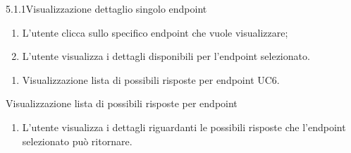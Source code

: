 \begin{usecase}{5.1.1}{Visualizzazione dettaglio singolo endpoint}\label{uc:visualizzazione-dettaglio-singolo-endpoint}

    \usecasemain{}
        \begin{enumerate}
            \item L'utente clicca sullo specifico endpoint che vuole visualizzare;
            \item L'utente visualizza i dettagli disponibili per l'endpoint selezionato.
        \end{enumerate}

    \usecaseext{}
        \begin{enumerate}
            \item Visualizzazione lista di possibili risposte per endpoint UC6.
        \end{enumerate}

\end{usecase}


\begin{usecase}{6}{Visualizzazione lista di possibili risposte per endpoint}\label{uc:visualizzazione-risposte-endpoint}

    \usecasemain{}
        \begin{enumerate}
            \item L'utente visualizza i dettagli riguardanti le possibili risposte che l'endpoint selezionato può ritornare.
        \end{enumerate}

\end{usecase}



